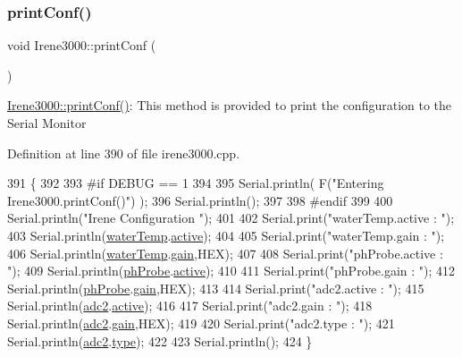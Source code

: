 \subsubsection{\texorpdfstring{print\+Conf()}{printConf()}}
{\footnotesize\ttfamily void Irene3000\+::print\+Conf (\begin{DoxyParamCaption}{ }\end{DoxyParamCaption})}

\hyperlink{class_irene3000_a7bc2414100b5e19eacc6630fa34b2654}{Irene3000\+::print\+Conf()}\+: This method is provided to print the configuration to the Serial Monitor 

Definition at line 390 of file irene3000.\+cpp.


\begin{DoxyCode}
391 \{
392 
393 \textcolor{preprocessor}{#if DEBUG == 1 }
394 
395     Serial.println( F(\textcolor{stringliteral}{"Entering Irene3000.printConf()"}) );
396     Serial.println();
397 
398 \textcolor{preprocessor}{#endif }
399 
400     Serial.println(\textcolor{stringliteral}{"Irene Configuration "});
401 
402     Serial.print(\textcolor{stringliteral}{"waterTemp.active : "});
403     Serial.println(\hyperlink{class_irene3000_af05612c78c758ce9db316c75ad937130}{waterTemp}.\hyperlink{struct_irene3000_1_1state_af7ff649f20b9a2fb6ca0f949ee9a25ce}{active});
404 
405     Serial.print(\textcolor{stringliteral}{"waterTemp.gain : "});
406     Serial.println(\hyperlink{class_irene3000_af05612c78c758ce9db316c75ad937130}{waterTemp}.\hyperlink{struct_irene3000_1_1state_a1ecf69d38cb31ecaf6b3602a3f3e93cb}{gain},HEX);    
407 
408     Serial.print(\textcolor{stringliteral}{"phProbe.active : "});
409     Serial.println(\hyperlink{class_irene3000_a997a4ee466fa1d5416e07e444965dc9e}{phProbe}.\hyperlink{struct_irene3000_1_1state_af7ff649f20b9a2fb6ca0f949ee9a25ce}{active});
410 
411     Serial.print(\textcolor{stringliteral}{"phProbe.gain : "});
412     Serial.println(\hyperlink{class_irene3000_a997a4ee466fa1d5416e07e444965dc9e}{phProbe}.\hyperlink{struct_irene3000_1_1state_a1ecf69d38cb31ecaf6b3602a3f3e93cb}{gain},HEX);
413     
414     Serial.print(\textcolor{stringliteral}{"adc2.active : "});
415     Serial.println(\hyperlink{class_irene3000_aae3a95a1c83c766cd2f299ce471c337e}{adc2}.\hyperlink{struct_irene3000_1_1state_af7ff649f20b9a2fb6ca0f949ee9a25ce}{active});
416 
417     Serial.print(\textcolor{stringliteral}{"adc2.gain : "});
418     Serial.println(\hyperlink{class_irene3000_aae3a95a1c83c766cd2f299ce471c337e}{adc2}.\hyperlink{struct_irene3000_1_1state_a1ecf69d38cb31ecaf6b3602a3f3e93cb}{gain},HEX);
419 
420     Serial.print(\textcolor{stringliteral}{"adc2.type : "});
421     Serial.println(\hyperlink{class_irene3000_aae3a95a1c83c766cd2f299ce471c337e}{adc2}.\hyperlink{struct_irene3000_1_1state_a9897a7e02727db6351d44006eec73799}{type});
422 
423     Serial.println();
424 \}
\end{DoxyCode}
